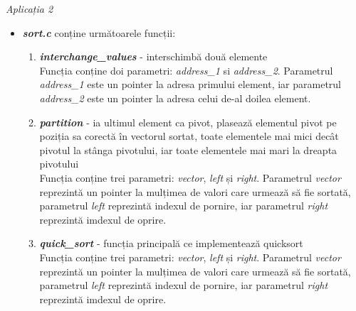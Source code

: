 \documentclass[11pt,a4paper]{article}
\begin{document}
\vspace{4cm}  

\noindent \emph{Aplicația 2}
\begin{itemize}
    \item \textbf{\textit{sort.c}} conține următoarele funcții: 
     \begin{enumerate}
        \item \textbf{\textit{interchange\_values}} - interschimbă două elemente  \\
        Funcția conține doi parametri: \emph{address\_1} si \emph{address\_2}.
        Parametrul \emph{address\_1} este un pointer la adresa primului element, iar parametrul \emph{address\_2} este un pointer la adresa celui de-al doilea element.
        \item \textbf{\textit{partition}} - ia ultimul element ca pivot, plasează
        elementul pivot pe poziția sa corectă în vectorul sortat, toate elementele mai mici decât pivotul la stânga pivotului, iar toate elementele mai mari la dreapta pivotului \\
        Funcția conține trei parametri: \emph{vector}, \emph{left} și \emph{right}.  Parametrul \emph{vector} reprezintă un pointer la mulțimea de valori care urmează să fie sortată, parametrul \emph{left} reprezintă indexul de pornire, iar parametrul \emph{right} reprezintă imdexul de oprire.
        \item \textbf{\textit{quick\_sort}} - funcția principală ce implementează quicksort \\
         Funcția conține trei parametri: \emph{vector}, \emph{left} și \emph{right}. Parametrul \emph{vector} reprezintă un pointer la mulțimea de valori care urmează să fie sortată, parametrul \emph{left} reprezintă indexul de pornire, iar parametrul \emph{right} reprezintă imdexul de oprire.
    \end{enumerate}
    

\end{itemize}
\end{document}
